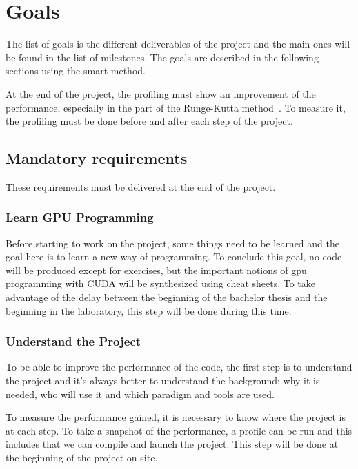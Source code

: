 \chapter{Goals}
\label{spec:ch:goals}

The list of goals is the different deliverables of the project and the main ones will be found in the list of milestones.
The goals are described in the following sections using the \acrshort{smart} method.

At the end of the project, the profiling must show an improvement of the performance, especially in the part of the Runge-Kutta method~\cite{Runge-Kutta-methods}.
To measure it, the profiling must be done before and after each step of the project.


\section{Mandatory requirements}
\label{spec:ch:goals:mandatory-requirements}

These requirements must be delivered at the end of the project.


\subsection{Learn GPU Programming}
\label{spec:ch:goals:mandatory-requirements:learn-gpu-programming}

Before starting to work on the project, some things need to be learned and the goal here is to learn a new way of programming.
To conclude this goal, no code will be produced except for exercises, but the important notions of \acrshort{gpu} programming with CUDA will be synthesized using cheat sheets.
To take advantage of the delay between the beginning of the bachelor thesis and the beginning in the laboratory, this step will be done during this time.


\subsection{Understand the Project}
\label{spec:ch:goals:mandatory-requirements:understand-the-project}

To be able to improve the performance of the code, the first step is to understand the project and it's always better to understand the background: why it is needed, who will use it and which paradigm and tools are used.

To measure the performance gained, it is necessary to know where the project is at each step.
To take a snapshot of the performance, a profile can be run and this includes that we can compile and launch the project.
This step will be done at the beginning of the project on-site.


